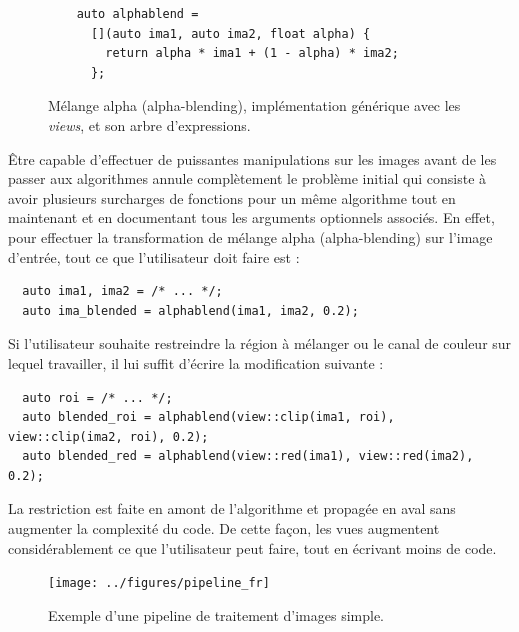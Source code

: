 \begin{figure}[htbp]
  \centering
  \begin{minipage}[b]{5.5cm}
    
  \end{minipage}
  \begin{minipage}[b]{5.5cm}
    \begin{verbatim}
    auto alphablend =
      [](auto ima1, auto ima2, float alpha) {
        return alpha * ima1 + (1 - alpha) * ima2;
      };
    \end{verbatim}
    \bigskip
    \bigskip
    \bigskip
  \end{minipage}
  \caption[]{Mélange alpha (alpha-blending), implémentation générique avec les \emph{views}, et son arbre
    d'expressions.}
  \label{resume:fig:new.alphablend}
\end{figure}

Être capable d'effectuer de puissantes manipulations sur les images avant de les passer aux algorithmes annule
complètement le problème initial qui consiste à avoir plusieurs surcharges de fonctions pour un même algorithme tout en
maintenant et en documentant tous les arguments optionnels associés. En effet, pour effectuer la transformation de
mélange alpha (alpha-blending) sur l'image d'entrée, tout ce que l'utilisateur doit faire est :
\begin{verbatim}
  auto ima1, ima2 = /* ... */;
  auto ima_blended = alphablend(ima1, ima2, 0.2);
\end{verbatim}
Si l'utilisateur souhaite restreindre la région à mélanger ou le canal de couleur sur lequel travailler, il lui suffit
d'écrire la modification suivante :
\begin{verbatim}
  auto roi = /* ... */;
  auto blended_roi = alphablend(view::clip(ima1, roi), view::clip(ima2, roi), 0.2);
  auto blended_red = alphablend(view::red(ima1), view::red(ima2), 0.2);
\end{verbatim}
La restriction est faite en amont de l'algorithme et propagée en aval sans augmenter la complexité du code. De cette
façon, les vues augmentent considérablement ce que l'utilisateur peut faire, tout en écrivant moins de code.

\begin{figure}[htbp]
  \centering
  \texttt{[image: ../figures/pipeline\_fr]}
  \caption[]{Exemple d'une pipeline de traitement d'images simple.}
  \label{resume:fig:view.pipeline}
\end{figure}

